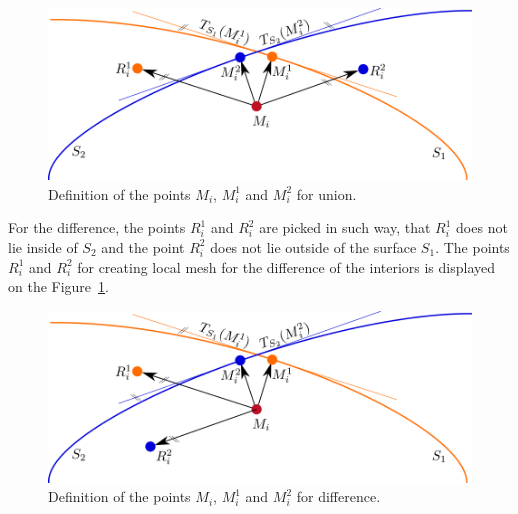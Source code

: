 \begin{figure}[h!]
    \centerline{\includegraphics[scale=0.5]{images/img75}}
    \caption[Definition of the points for union]
    {Definition of the points $M_i$, $M_i^1$ and $M_i^2$ for union.}
    \label{img:75}
\end{figure}

For the difference, the points $R_i^1$ and $R_i^2$ are picked in such way, that $R_i^1$ 
does not lie inside of $S_2$ and the point $R_i^2$ does not lie 
outside of the surface $S_1$. The points $R_i^1$ and $R_i^2$ for creating local mesh for 
the difference of the interiors is displayed on the Figure~\ref{img:75}.

\begin{figure}[h!]
    \centerline{\includegraphics[scale=0.5]{images/img76}}
    \caption[Definition of the points for difference]
    {Definition of the points $M_i$, $M_i^1$ and $M_i^2$ for difference.}
    \label{img:76}
\end{figure}
